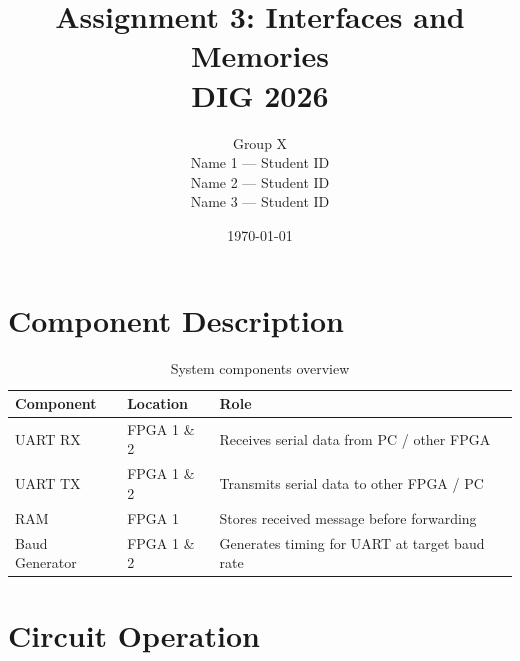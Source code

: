 \documentclass[11pt,a4paper]{article}
\title{\textbf{Assignment 3: Interfaces and Memories}\\
       \large DIG 2026}
\author{
  Group X \\[4pt]
  Name 1 — Student ID \\
  Name 2 — Student ID \\
  Name 3 — Student ID
}
\date{\today}
\begin{document}
\maketitle

\section{Component Description}


\begin{table}[H]
\centering
\caption{System components overview}
\begin{tabular}{|l|l|p{6cm}|}
\hline
\textbf{Component} & \textbf{Location} & \textbf{Role} \\ \hline
UART RX        & FPGA 1 \& 2 & Receives serial data from PC / other FPGA \\ \hline
UART TX        & FPGA 1 \& 2 & Transmits serial data to other FPGA / PC  \\ \hline
RAM            & FPGA 1      & Stores received message before forwarding  \\ \hline
Baud Generator & FPGA 1 \& 2 & Generates timing for UART at target baud rate \\ \hline
\end{tabular}
\end{table}


\section{Circuit Operation}




\end{document}
